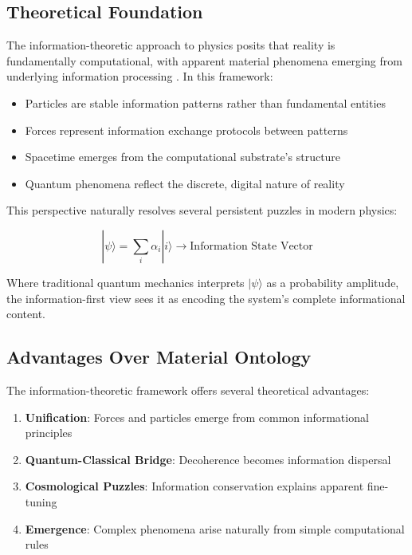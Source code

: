 \documentclass[12pt,preprint]{article}
\begin{document}
\subsection{Theoretical Foundation}

The information-theoretic approach to physics posits that reality is fundamentally computational, with apparent material phenomena emerging from underlying information processing \cite{lloyd2006programming}. In this framework:

\begin{itemize}
\item Particles are stable information patterns rather than fundamental entities
\item Forces represent information exchange protocols between patterns
\item Spacetime emerges from the computational substrate's structure
\item Quantum phenomena reflect the discrete, digital nature of reality
\end{itemize}

This perspective naturally resolves several persistent puzzles in modern physics:

\begin{equation}
|\psi\rangle = \sum_i \alpha_i |i\rangle \rightarrow \text{Information State Vector}
\end{equation}

Where traditional quantum mechanics interprets $|\psi\rangle$ as a probability amplitude, the information-first view sees it as encoding the system's complete informational content.

\subsection{Advantages Over Material Ontology}

The information-theoretic framework offers several theoretical advantages:

\begin{enumerate}
\item \textbf{Unification}: Forces and particles emerge from common informational principles
\item \textbf{Quantum-Classical Bridge}: Decoherence becomes information dispersal
\item \textbf{Cosmological Puzzles}: Information conservation explains apparent fine-tuning
\item \textbf{Emergence}: Complex phenomena arise naturally from simple computational rules
\end{enumerate}
\end{document}
